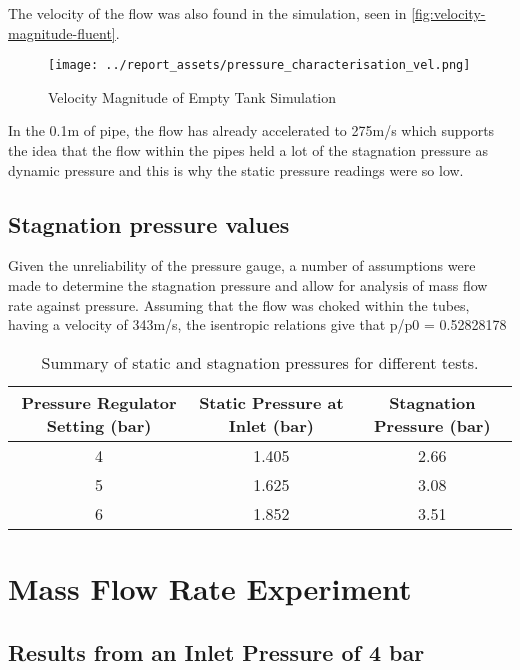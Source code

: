 The velocity of the flow was also found in the simulation, seen in \autoref{fig:velocity-magnitude-fluent}.
\begin{figure}[htbp]
    \centering
    
    \begin{minipage}{0.9\textwidth}
        \centering
        \texttt{[image: ../report\_assets/pressure\_characterisation\_vel.png]}
        \caption{Velocity Magnitude of Empty Tank Simulation}\label{fig:velocity-magnitude-fluent}
    \end{minipage}    
    
\end{figure}    
In the 0.1m of pipe, the flow has already accelerated to 275m/s which supports the idea that the flow within the pipes held a lot of the stagnation pressure as dynamic pressure and this is why the static pressure readings were so low.
\subsection{Stagnation pressure values}
Given the unreliability of the pressure gauge, a number of assumptions were made to determine the stagnation pressure and allow for analysis of mass flow rate against pressure. Assuming that the flow was choked within the tubes, having a velocity of 343m/s, the isentropic relations give that p/p0 =  0.52828178
\begin{table}[htbp]
    \centering
    \begin{tabular}{|c|c|c|}
        \hline
        Pressure Regulator Setting (bar) & Static Pressure at Inlet (bar) &  Stagnation Pressure (bar) \\
        \hline
        4 & 1.405 & 2.66 \\
        5 & 1.625 & 3.08 \\
        6 & 1.852 & 3.51 \\
        \hline
    \end{tabular}    
    \caption{Summary of static and stagnation pressures for different tests.}
    \label{tab:static-stag-pressures}
\end{table}    


\newpage
\section{Mass Flow Rate Experiment}
\subsection{Results from an Inlet Pressure of 4 bar}
\vfill

